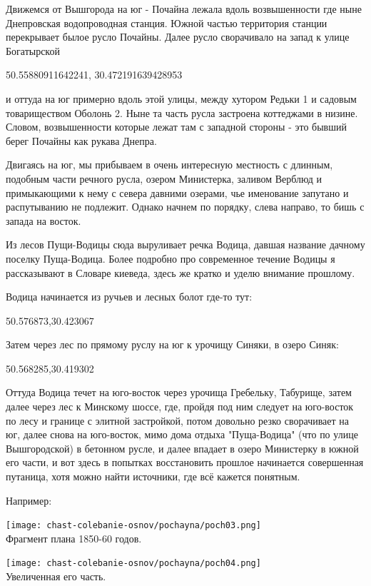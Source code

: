 Движемся от Вышгорода на юг - Почайна лежала вдоль возвышенности где ныне Днепровская водопроводная станция. Южной частью территория станции перекрывает былое русло Почайны. Далее русло сворачивало на запад к улице Богатырской

50.55880911642241, 30.472191639428953

и оттуда на юг примерно вдоль этой улицы, между хутором Редьки 1 и садовым товариществом Оболонь 2. Ныне та часть русла застроена коттеджами в низине. Словом, возвышенности которые лежат там с западной стороны - это бывший берег Почайны как рукава Днепра. 

Двигаясь на юг, мы прибываем в очень интересную местность с длинным, подобным части речного русла, озером Министерка, заливом Верблюд и примыкающими к нему с севера давними озерами, чье именование запутано и распутыванию не подлежит. Однако начнем по порядку, слева направо, то бишь с запада на восток.

Из лесов Пущи-Водицы сюда выруливает речка Водица, давшая название дачному поселку Пуща-Водица. Более подробно про современное течение Водицы я рассказывают в Словаре киеведа, здесь же кратко и уделю внимание прошлому.

Водица начинается из ручьев и лесных болот где-то тут:

50.576873,30.423067

Затем через лес по прямому руслу на юг к урочищу Синяки, в озеро Синяк:

50.568285,30.419302

Оттуда Водица течет на юго-восток через урочища Гребельку, Табурище, затем далее через лес к Минскому шоссе, где, пройдя под ним следует на юго-восток по лесу и границе с элитной застройкой, потом довольно резко сворачивает на юг, далее снова на юго-восток, мимо дома отдыха "Пуща-Водица" (что по улице Вышгородской) в бетонном русле, и далее впадает в озеро Министерку в южной его части, и вот здесь в попытках восстановить прошлое начинается совершенная путаница, хотя можно найти источники, где всё кажется понятным.

Например:

\begin{center}
\texttt{[image: chast-colebanie-osnov/pochayna/poch03.png]}\\

Фрагмент плана 1850-60 годов.
\end{center}

\begin{center}
\texttt{[image: chast-colebanie-osnov/pochayna/poch04.png]}\\

Увеличенная его часть.
\end{center}

